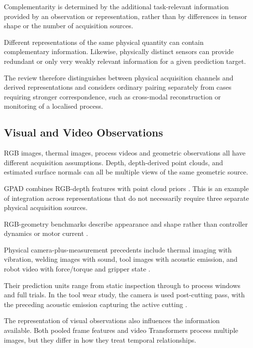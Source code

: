 Complementarity is determined by the additional task-relevant information provided by an observation
or representation, rather than by differences in tensor shape or the number of acquisition sources.

Different representations of the same physical quantity can contain complementary information.
Likewise, physically distinct sensors can provide redundant or only very weakly relevant information
for a given prediction target.

The review therefore distinguishes between physical acquisition channels and derived representations
and considers ordinary pairing separately from cases requiring stronger correspondence, such as
cross-modal reconstruction or monitoring of a localised process.

\subsection{Visual and Video Observations}

RGB images, thermal images, process videos and geometric observations all have different acquisition
assumptions. Depth, depth-derived point clouds, and estimated surface normals can all be multiple
views of the same geometric source.

GPAD combines RGB-depth features with point cloud priors \parencite[PDF pp.~4--7]{P024}. This is an
example of integration across representations that do not necessarily require three separate
physical acquisition sources.

RGB-geometry benchmarks describe appearance and shape rather than controller dynamics or motor
current \parencite{Bergmann2022The,Bonfiglioli2023The}.

Physical camera-plus-measurement precedents include thermal imaging with vibration, welding images
with sound, tool images with acoustic emission, and robot video with force/torque and gripper state
\parencite{Huo2022Multisensor,Hua2026Weld,P045,Thoduka2024Handover}.

Their prediction units range from static inspection through to process windows and full trials. In
the tool wear study, the camera is used post-cutting pass, with the preceding acoustic emission
capturing the active cutting \parencite[PDF pp.~19--22]{P045}.

The representation of visual observations also influences the information available. Both pooled
frame features and video Transformers process multiple images, but they differ in how they treat
temporal relationships.

